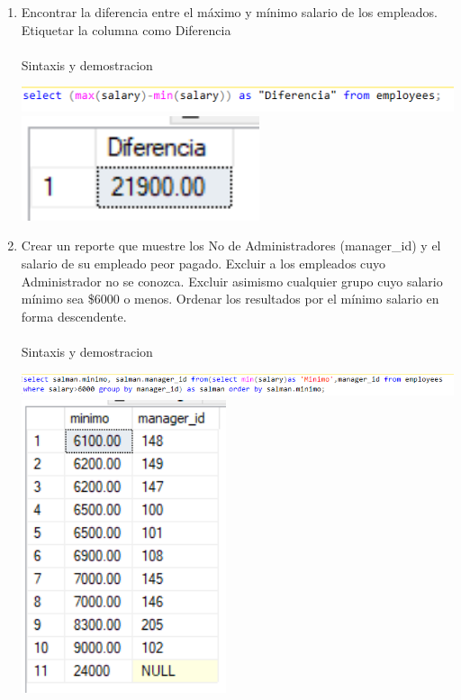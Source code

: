 \begin{enumerate}[1.]
\begin{center}
	\end{center}
	\item Encontrar la diferencia entre el m\'aximo y m\'inimo salario de los empleados. Etiquetar la columna como Diferencia
	\\
	\\Sintaxis y demostracion
	\begin{center}
	\includegraphics[width=15cm]{./Imagenes/75} 
	\includegraphics[width=7cm]{./Imagenes/752} 
	\end{center}
	\item Crear un reporte que muestre los No de Administradores (manager\_id) y el salario de su empleado peor pagado. Excluir a los empleados cuyo Administrador no se conozca. Excluir asimismo cualquier grupo cuyo salario mínimo sea \$6000 o menos. Ordenar los resultados por el mínimo salario en forma descendente.
	\\
	\\Sintaxis y demostracion
	\begin{center}
	\includegraphics[width=16cm]{./Imagenes/76} 
	\includegraphics[width=6cm]{./Imagenes/762} 
	\end{center}
	
\end{enumerate}

